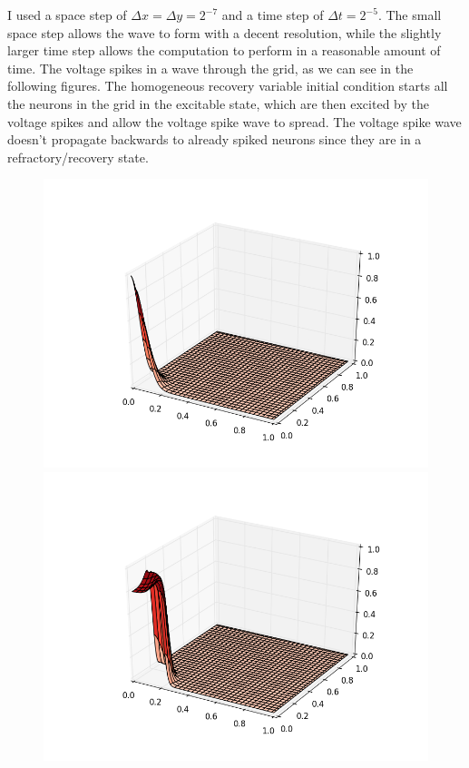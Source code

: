 \documentclass[12pt]{article}
\begin{document}
\begin{enumerate}[(a)]
I used a space step of $\Delta x = \Delta y = 2^{-7}$ and a time step of $\Delta t = 2^{-5}$.  The small space step allows the wave to form with a decent resolution, while the slightly larger time step allows the computation to perform in a reasonable amount of time.
The voltage spikes in a wave through the grid, as we can see in the following figures.  The homogeneous recovery variable initial condition starts all the neurons in the grid in the excitable state, which are then excited by the voltage spikes and allow the voltage spike wave to spread.  The voltage spike wave doesn't propagate backwards to already spiked neurons since they are in a refractory/recovery state.
\begin{figure}[H]
\includegraphics[scale=0.4]{partb_fig_frames/partb_fig01.png}%
\includegraphics[scale=0.4]{partb_fig_frames/partb_fig03.png}

\end{figure}
\end{enumerate}
\end{document}
